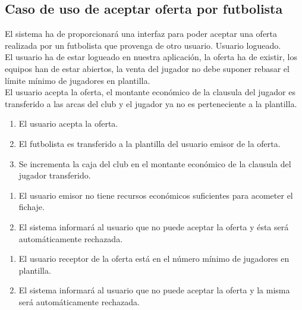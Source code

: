 \subsection{Caso de uso de aceptar oferta por futbolista}
 El sistema ha de proporcionará una interfaz
para poder aceptar una oferta realizada por un futbolista que
provenga de otro usuario.
 Usuario logueado. \\
 El usuario ha de estar logueado en
nuestra aplicación, la oferta ha de existir, los equipos han de estar
abiertos, la venta del jugador no debe suponer rebasar el límite
mínimo de jugadores en plantilla. \\
 El usuario acepta la oferta, el montante
económico de la clausula del jugador es transferido a las arcas del
club y el jugador ya no es perteneciente a la plantilla.
\begin{enumerate}
  \item El usuario acepta la oferta.
  \item El futbolista es transferido a la plantilla del usuario emisor
    de la oferta.
  \item Se incrementa la caja del club en el montante económico de la
    clausula del jugador transferido.
\end{enumerate}
\begin{enumerate}
  \item El usuario emisor no tiene recursos económicos suficientes
    para acometer el fichaje.
  \item El sistema informará al usuario que no puede aceptar la oferta
    y ésta será automáticamente rechazada.
\end{enumerate}
\begin{enumerate}
  \item El usuario receptor de la oferta está en el número mínimo de
    jugadores en plantilla.
  \item El sistema informará al usuario que no puede aceptar la oferta
    y la misma será automáticamente rechazada.
\end{enumerate}
